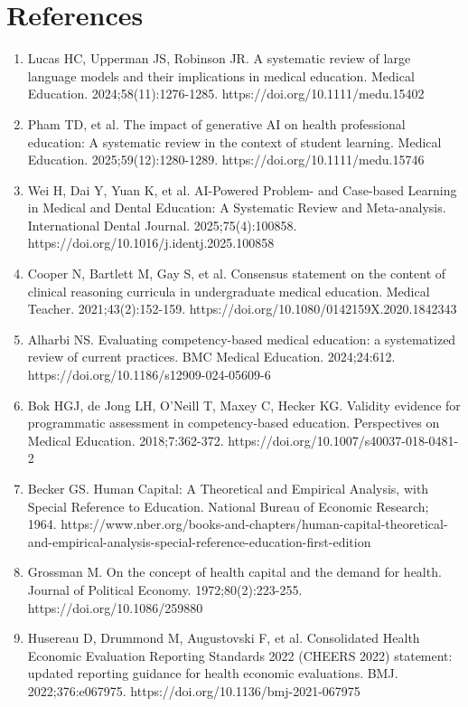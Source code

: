 \documentclass[11pt,a4paper]{article}
\begin{document}
\section*{References}\begin{enumerate}[leftmargin=*]\n\item Lucas HC, Upperman JS, Robinson JR. A systematic review of large language models and their implications in medical education. Medical Education. 2024;58(11):1276-1285. https://doi.org/10.1111/medu.15402
\item Pham TD, et al. The impact of generative AI on health professional education: A systematic review in the context of student learning. Medical Education. 2025;59(12):1280-1289. https://doi.org/10.1111/medu.15746
\item Wei H, Dai Y, Yuan K, et al. AI-Powered Problem- and Case-based Learning in Medical and Dental Education: A Systematic Review and Meta-analysis. International Dental Journal. 2025;75(4):100858. https://doi.org/10.1016/j.identj.2025.100858
\item Cooper N, Bartlett M, Gay S, et al. Consensus statement on the content of clinical reasoning curricula in undergraduate medical education. Medical Teacher. 2021;43(2):152-159. https://doi.org/10.1080/0142159X.2020.1842343
\item Alharbi NS. Evaluating competency-based medical education: a systematized review of current practices. BMC Medical Education. 2024;24:612. https://doi.org/10.1186/s12909-024-05609-6
\item Bok HGJ, de Jong LH, O'Neill T, Maxey C, Hecker KG. Validity evidence for programmatic assessment in competency-based education. Perspectives on Medical Education. 2018;7:362-372. https://doi.org/10.1007/s40037-018-0481-2
\item Becker GS. Human Capital: A Theoretical and Empirical Analysis, with Special Reference to Education. National Bureau of Economic Research; 1964. https://www.nber.org/books-and-chapters/human-capital-theoretical-and-empirical-analysis-special-reference-education-first-edition
\item Grossman M. On the concept of health capital and the demand for health. Journal of Political Economy. 1972;80(2):223-255. https://doi.org/10.1086/259880
\item Husereau D, Drummond M, Augustovski F, et al. Consolidated Health Economic Evaluation Reporting Standards 2022 (CHEERS 2022) statement: updated reporting guidance for health economic evaluations. BMJ. 2022;376:e067975. https://doi.org/10.1136/bmj-2021-067975

\end{enumerate}
\end{document}
